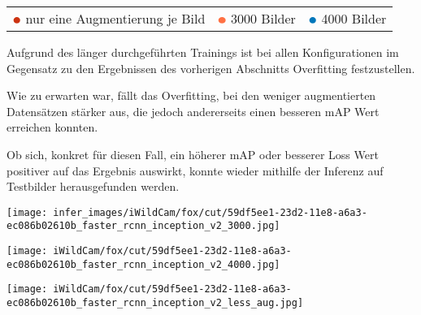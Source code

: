 \begin{table}[htb]
  \centering
  \begin{tabular}{ m{}<{\centering}
                   m{}<{\centering}
                   m{}<{\centering}}
      $\color[HTML]{CC3311}\medbullet$ nur eine Augmentierung je Bild &
      $\color[HTML]{FF7043}\medbullet$  3000 Bilder &
      $\color[HTML]{0077BB}\medbullet$  4000 Bilder
  \end{tabular}    
\end{table}
\vspace{1cm}

Aufgrund des länger durchgeführten Trainings
ist bei allen Konfigurationen im Gegensatz zu den
Ergebnissen des vorherigen Abschnitts Overfitting 
festzustellen.

Wie zu erwarten war, fällt das Overfitting, bei den weniger  
augmentierten Datensätzen stärker aus, die jedoch andererseits
einen besseren mAP Wert erreichen konnten.


Ob sich, konkret für diesen Fall, ein höherer mAP oder 
besserer Loss Wert positiver auf das Ergebnis auswirkt,
konnte wieder mithilfe der Inferenz auf Testbilder 
herausgefunden werden.
\vspace{1cm}

\begin{minipage}{0.333\textwidth}
  \centering
  \texttt{[image: infer\_images/iWildCam/fox/cut/59df5ee1-23d2-11e8-a6a3-ec086b02610b\_faster\_rcnn\_inception\_v2\_3000.jpg]}
  \label{fig:infer_res_3000}
\end{minipage}
\begin{minipage}{0.333\textwidth}
  \centering
  \label{fig:infer_res_4000}
  \texttt{[image: iWildCam/fox/cut/59df5ee1-23d2-11e8-a6a3-ec086b02610b\_faster\_rcnn\_inception\_v2\_4000.jpg]}
\end{minipage}
\begin{minipage}{0.333\textwidth}
  \centering
  \texttt{[image: iWildCam/fox/cut/59df5ee1-23d2-11e8-a6a3-ec086b02610b\_faster\_rcnn\_inception\_v2\_less\_aug.jpg]}
  \label{fig:infer_rest_05}
\end{minipage}
\vspace{1cm}

